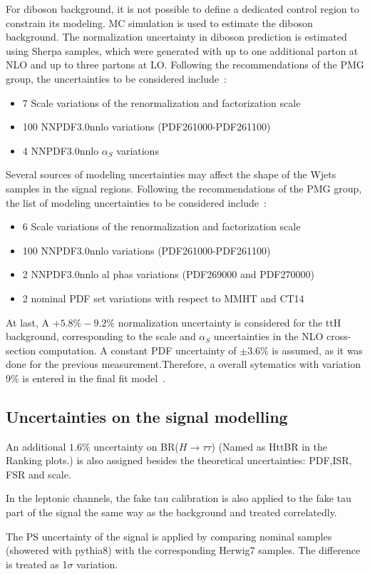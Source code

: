 For diboson background, it is not possible to define a dedicated control region to constrain its modeling. MC simulation is used to estimate the diboson background. The normalization uncertainty in diboson prediction is estimated using Sherpa samples, which were generated with up to one additional parton at NLO and up to three partons at LO. Following the recommendations of the PMG group, the uncertainties to be considered include~\cite{dibosonRes}: 
\begin{itemize}
	\item   7 Scale variations of the renormalization and factorization scale
	\item   100 NNPDF3.0nnlo variations (PDF261000-PDF261100)
	\item   4 NNPDF3.0nnlo $\alpha_{S}$ variations
\end{itemize}

Several sources of modeling uncertainties may affect the shape of the Wjets samples in the signal regions. Following the recommendations of the PMG group, the list of modeling uncertainties to be considered include~\cite{dibosonRes}:
\begin{itemize}
\item 6 Scale variations of the renormalization and factorization scale
\item 100 NNPDF3.0nnlo variations (PDF261000-PDF261100)
\item 2 NNPDF3.0nnlo al phas variations (PDF269000 and PDF270000)
\item 2 nominal PDF set variations with respect to MMHT and CT14
\end{itemize}

At last, A $+5.8\%-9.2\%$ normalization uncertainty is considered for the ttH background, corresponding to the scale and $\alpha_{S}$ uncertainties in the NLO cross-section computation. A constant PDF uncertainty of
$\pm3.6$\% is assumed, as it was done for the previous measurement.Therefore, a overall sytematics with variation 9\% is entered in the final fit model~\cite{ttZRun2}.

\subsection{Uncertainties on the signal modelling}

An additional $1.6\%$ uncertainty on BR($H\to\tau\tau$) (Named as HttBR in the Ranking plots.) is also assigned \cite{HiggsBR} besides the theoretical uncertainties: PDF,ISR, FSR and scale.

In the leptonic channels, the fake tau calibration is also applied to the fake tau part of the signal the same way as the background and treated correlatedly.

The PS uncertainty of the signal is applied by comparing nominal samples (showered with pythia8) with the corresponding Herwig7 samples. The difference is treated as 1$\sigma$ variation.
